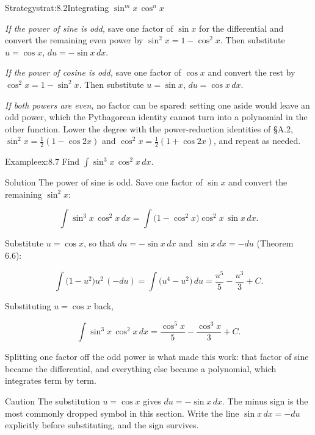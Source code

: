 \documentclass[a4paper,12pt,oneside]{memoir}
\begin{document}
\begin{envstrategy}{Strategy}{strat:8.2}{Integrating \(\sin^m x\,\cos^n x\)}
\begin{steps}
  \item \emph{If the power of sine is odd,} save one factor of \(\sin x\) for the differential and convert the remaining even power by \(\sin^{2}x = 1 - \cos^{2}x\). Then substitute \(u = \cos x\), \(du = -\sin x\,dx\).
  \item \emph{If the power of cosine is odd,} save one factor of \(\cos x\) and convert the rest by \(\cos^{2}x = 1 - \sin^{2}x\). Then substitute \(u = \sin x\), \(du = \cos x\,dx\).
  \item \emph{If both powers are even,} no factor can be spared: setting one aside would leave an odd power, which the Pythagorean identity cannot turn into a polynomial in the other function. Lower the degree with the power-reduction identities of §A.2, \(\sin^{2}x = \tfrac{1}{2}(1 - \cos 2x)\) and \(\cos^{2}x = \tfrac{1}{2}(1 + \cos 2x)\), and repeat as needed.
\end{steps}
\end{envstrategy}
\begin{workedexample}
\begin{envexample}{Example}{ex:8.7}{}
Find \(\displaystyle\int \sin^{3}x\,\cos^{2}x\,dx\).
\end{envexample}
\begin{envsolution}{Solution}{}{}
The power of sine is odd. Save one factor of \(\sin x\) and convert the remaining \(\sin^{2}x\):

\[ \int \sin^{3}x\,\cos^{2}x\,dx = \int \bigl(1 - \cos^{2}x\bigr)\cos^{2}x\,\sin x\,dx. \]

Substitute \(u = \cos x\), so that \(du = -\sin x\,dx\) and \(\sin x\,dx = -du\) (Theorem 6.6):

\[ \int \bigl(1 - u^{2}\bigr)u^{2}\,(-du) = \int \bigl(u^{4} - u^{2}\bigr)\,du = \frac{u^{5}}{5} - \frac{u^{3}}{3} + C. \]

Substituting \(u = \cos x\) back,

\[ \int \sin^{3}x\,\cos^{2}x\,dx = \frac{\cos^{5}x}{5} - \frac{\cos^{3}x}{3} + C. \]

Splitting one factor off the odd power is what made this work: that factor of sine became the differential, and everything else became a polynomial, which integrates term by term. \qedmark
\end{envsolution}
\end{workedexample}
\begin{envcaution}{Caution}{}{}
The substitution \(u = \cos x\) gives \(du = -\sin x\,dx\). The minus sign is the most commonly dropped symbol in this section. Write the line \(\sin x\,dx = -du\) explicitly before substituting, and the sign survives.
\end{envcaution}
\end{document}
